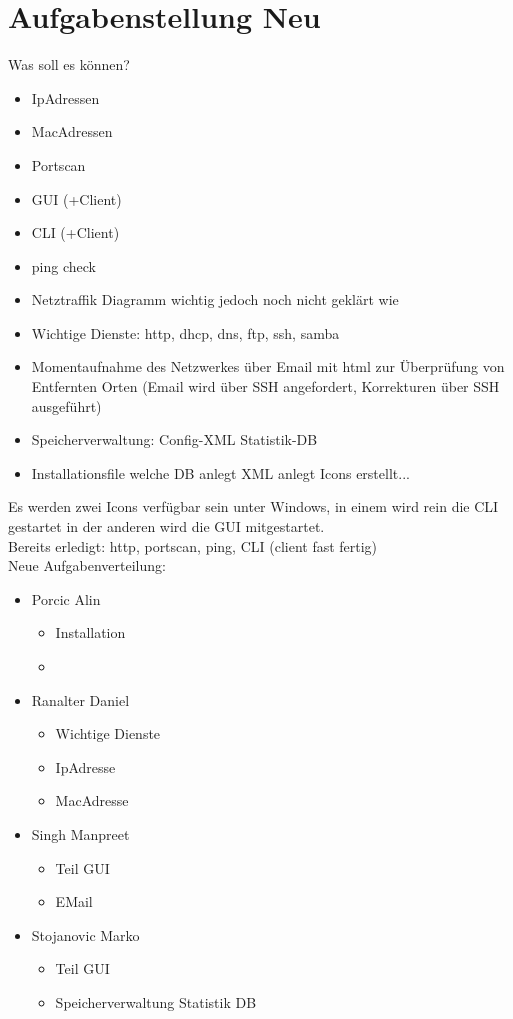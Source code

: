 \documentclass[10pt,a4paper]{report}
\begin{document}
\chapter{Aufgabenstellung Neu}
Was soll es können?\\
\begin{itemize}
\item IpAdressen 
\item MacAdressen
\item Portscan
\item GUI (+Client)
\item CLI (+Client)
\item ping check
\item Netztraffik Diagramm wichtig jedoch noch nicht geklärt wie
\item Wichtige Dienste: http, dhcp, dns, ftp, ssh, samba 
\item Momentaufnahme des Netzwerkes über Email mit html zur Überprüfung von Entfernten Orten (Email wird über SSH angefordert, Korrekturen über SSH ausgeführt)
\item Speicherverwaltung: Config-XML Statistik-DB
\item Installationsfile welche DB anlegt XML anlegt Icons erstellt...
\end{itemize}
Es werden zwei Icons verfügbar sein unter Windows, in einem wird rein die CLI gestartet in der anderen wird die GUI mitgestartet.\\
Bereits erledigt: http, portscan, ping, CLI (client fast fertig)\\
Neue Aufgabenverteilung:
\begin{itemize}
\item Porcic Alin\\
\begin{itemize}
\item Installation
\item 
\end{itemize}
\item Ranalter Daniel
\begin{itemize}
\item Wichtige Dienste
\item IpAdresse
\item MacAdresse
\end{itemize}
\item Singh Manpreet
\begin{itemize}
\item Teil GUI
\item EMail 
\end{itemize}
\item Stojanovic Marko
\begin{itemize}
\item Teil GUI
\item Speicherverwaltung Statistik DB
\end{itemize}
\end{itemize}
\end{document}
